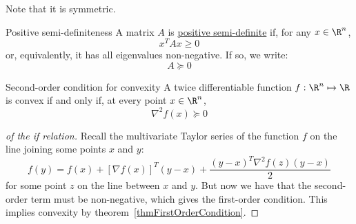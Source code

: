 \documentclass[../Main.tex]{subfiles}
\begin{document}
Note that it is symmetric.
\begin{definition}{Positive semi-definiteness}
    A matrix $A$ is \underline{positive semi-definite} if, for any $x \in \R^n$,
    \begin{equation}
        x^T A x \geq 0
        \label{eqnPositiveSemiDefinite}
    \end{equation}
    or, equivalently, it has all eigenvalues non-negative. If so, we write:
    \begin{equation*}
        A \succeq 0 
    \end{equation*}
\end{definition}
\begin{theorem}{Second-order condition for convexity}
    A twice differentiable function $f : \R^n \mapsto \R$ is convex if and only if, at every point $x \in \R^n$,
    \begin{equation}
        \nabla^2 f(x) \succeq 0
        \label{eqnSecondOrderCondition}
    \end{equation}
    \label{thmSecondOrderCondition}
\end{theorem}
\begin{proof}[of the if relation]
    Recall the multivariate Taylor series of the function $f$ on the line joining some points $x$ and $y$:
    \begin{equation*}
        f(y) = f(x) + [\nabla f(x)]^T (y - x) + \frac{(y - x)^T \nabla^2 f(z) (y-x)}{2}
    \end{equation*}
    for some point $z$ on the line between $x$ and $y$. But now we have that the second-order term must be non-negative, which gives the first-order condition. This implies convexity by theorem~\ref{thmFirstOrderCondition}.
\end{proof}
\end{document}
